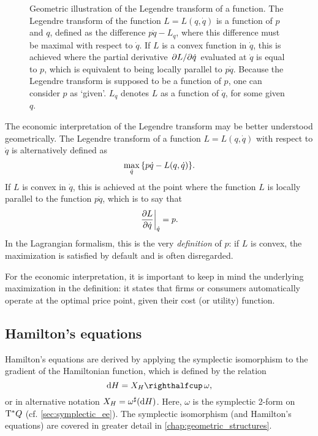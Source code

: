 \begin{figure}[ht]
    \centering
    
    \caption{Geometric illustration of the Legendre transform of a function. The Legendre transform of the function $L = L(q, \dot{q})$ is a function of $p$ and $q$, defined as the difference $p\dot{q} - L_q$, where this difference must be maximal with respect to $\dot{q}$. If $L$ is a convex function in $\dot{q}$, this is achieved where the partial derivative $\pdv*{L}{\dot{q}}$ evaluated at $\dot{q}$ is equal to $p$, which is equivalent to being locally parallel to $p\dot{q}$. Because the Legendre transform is supposed to be a function of $p$, one can consider $p$ as `given'. $L_q$ denotes $L$ as a function of $\dot{q}$, for some given $q$.} 
    \label{fig:my_label}
\end{figure}

The economic interpretation of the Legendre transform may be better understood geometrically. The Legendre transform of a function $L = L(q, \dot{q})$ with respect to $\dot{q}$ is alternatively defined as
\begin{equation}
    \max_{\dot{q}}\qty{p\dot{q} - L(q, \dot{q})}.
\end{equation}
If $L$ is convex in $\dot{q}$, this is achieved at the point where the function $L$ is locally parallel to the function $p\dot{q}$, which is to say that
\begin{equation}
    \left.\pdv{L}{\dot{q}}\right |_{\dot{q}} = p.
\end{equation}
In the Lagrangian formalism, this is the very \emph{definition} of $p$: if $L$ is convex, the maximization is satisfied by default and is often disregarded.

For the economic interpretation, it is important to keep in mind the underlying maximization in the definition: it states that firms or consumers automatically operate at the optimal price point, given their cost (or utility) function.

\subsection{Hamilton's equations} 
Hamilton's equations are derived by applying the symplectic isomorphism to the gradient of the Hamiltonian function, which is defined by the relation
\begin{equation}
    \dd{H} = \intpr{X_H}{\omega},
\end{equation}
or in alternative notation \(X_H = \omega^\sharp(\dd{H})\). Here, $\omega$ is the symplectic 2-form on $\mathrm{T}^*Q$ (cf. \cref{sec:symplectic_ee}). The symplectic isomorphism (and Hamilton's equations) are covered in greater detail in \cref{chap:geometric_structures}.

